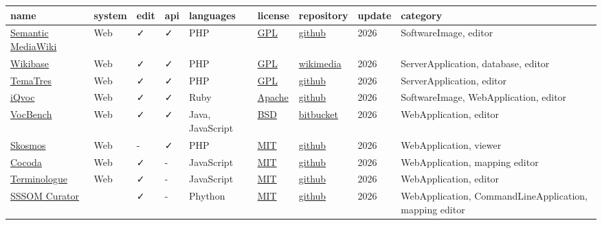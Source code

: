 \documentclass[
  DIV=10]{article}
\begin{document}
\begin{longtable}[]{@{}lllllllll@{}}
\toprule\noalign{}
name & system & edit & api & languages & license & repository & update &
category \\
\midrule\noalign{}
\endhead
\bottomrule\noalign{}
\endlastfoot
\href{https://www.semantic-mediawiki.org/}{Semantic MediaWiki} & Web & ✓
& ✓ & PHP & \href{https://spdx.org/licenses/GPL-3.0-or-later}{GPL} &
\href{https://github.com/SemanticMediaWiki/SemanticMediaWiki/}{github} &
2026 & SoftwareImage, editor \\
\href{http://wikiba.se/}{Wikibase} & Web & ✓ & ✓ & PHP &
\href{https://spdx.org/licenses/GPL-3.0-or-later}{GPL} &
\href{https://gerrit.wikimedia.org/g/mediawiki/extensions/Wikibase}{wikimedia}
& 2026 & ServerApplication, database, editor \\
\href{https://vocabularyserver.com/web/}{TemaTres} & Web & ✓ & ✓ & PHP &
\href{https://spdx.org/licenses/GPL-3.0-or-later}{GPL} &
\href{https://github.com/tematres/TemaTres-Vocabulary-Server}{github} &
2026 & ServerApplication, editor \\
\href{https://iqvoc.net/}{iQvoc} & Web & ✓ & ✓ & Ruby &
\href{https://spdx.org/licenses/Apache-2.0}{Apache} &
\href{https://github.com/innoq/iqvoc}{github} & 2026 & SoftwareImage,
WebApplication, editor \\
\href{https://vocbench.uniroma2.it/}{VocBench} & Web & ✓ & ✓ & Java,
JavaScript & \href{https://spdx.org/licenses/BSD-3-Clause}{BSD} &
\href{https://bitbucket.org/art-uniroma2/vocbench3/src/master/}{bitbucket}
& 2026 & WebApplication, editor \\
\href{https://skosmos.org/}{Skosmos} & Web & - & ✓ & PHP &
\href{https://spdx.org/licenses/MIT}{MIT} &
\href{https://github.com/NatLibFi/Skosmos}{github} & 2026 &
WebApplication, viewer \\
\href{https://coli-conc.gbv.de/cocoda/}{Cocoda} & Web & ✓ & - &
JavaScript & \href{https://spdx.org/licenses/MIT}{MIT} &
\href{https://github.com/gbv/cocoda}{github} & 2026 & WebApplication,
mapping editor \\
\href{https://www.terminologue.org/}{Terminologue} & Web & ✓ & - &
JavaScript & \href{https://spdx.org/licenses/MIT}{MIT} &
\href{https://github.com/gaois/terminologue}{github} & 2026 &
WebApplication, editor \\
\href{https://github.com/cthoyt/sssom-curator\#readme}{SSSOM Curator} &
& ✓ & - & Phython & \href{https://spdx.org/licenses/MIT}{MIT} &
\href{https://github.com/cthoyt/sssom-curator}{github} & 2026 &
WebApplication, CommandLineApplication, mapping editor \\

\end{longtable}
\end{document}
